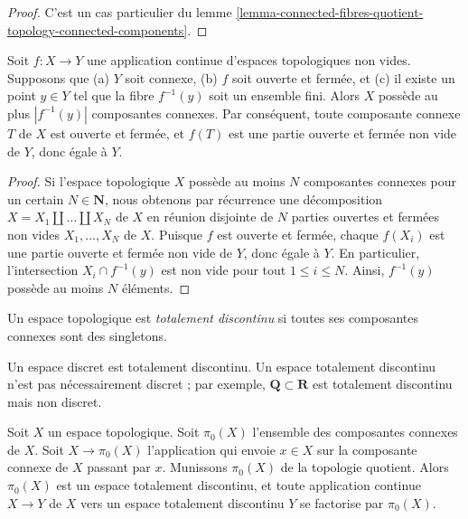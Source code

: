 \begin{proof}
C'est un cas particulier du
lemme \ref{lemma-connected-fibres-quotient-topology-connected-components}.
\end{proof}

\begin{lemma}
\label{lemma-finite-fibre-connected-components}
Soit $f : X \to Y$ une application continue d'espaces topologiques non vides.
Supposons que
(a) $Y$ soit connexe,
(b) $f$ soit ouverte et fermée, et
(c) il existe un point $y\in Y$ tel que la fibre $f^{-1}(y)$ soit un ensemble
fini. Alors $X$ possède au plus $|f^{-1}(y)|$ composantes connexes. Par
conséquent, toute composante connexe $T$ de $X$ est ouverte et fermée, et
$f(T)$ est une partie ouverte et fermée non vide de $Y$, donc égale à $Y$.
\end{lemma}

\begin{proof}
Si l'espace topologique $X$ possède au moins $N$ composantes connexes pour un
certain $N \in \mathbf{N}$, nous obtenons par récurrence une décomposition
$X = X_1 \amalg \ldots \amalg X_N$ de $X$ en réunion disjointe de $N$ parties
ouvertes et fermées non vides $X_1, \ldots , X_N$ de $X$. Puisque $f$ est
ouverte et fermée, chaque $f(X_i)$ est une partie ouverte et fermée non vide de
$Y$, donc égale à $Y$. En particulier, l'intersection
$X_i \cap f^{-1}(y)$ est non vide pour tout $1 \leq i \leq N$. Ainsi,
$f^{-1}(y)$ possède au moins $N$ éléments.
\end{proof}

\begin{definition}
\label{definition-totally-disconnected}
Un espace topologique est {\it totalement discontinu} si toutes ses composantes
connexes sont des singletons.
\end{definition}

\noindent
Un espace discret est totalement discontinu.
Un espace totalement discontinu n'est pas nécessairement discret ; par
exemple, $\mathbf{Q} \subset \mathbf{R}$ est totalement discontinu mais non
discret.

\begin{lemma}
\label{lemma-space-connected-components}
Soit $X$ un espace topologique. Soit $\pi_0(X)$ l'ensemble des composantes
connexes de $X$. Soit $X \to \pi_0(X)$ l'application qui envoie $x \in X$
sur la composante connexe de $X$ passant par $x$. Munissons $\pi_0(X)$ de la
topologie quotient. Alors $\pi_0(X)$ est un espace totalement discontinu, et
toute application continue $X \to Y$ de $X$ vers un espace totalement
discontinu $Y$ se factorise par $\pi_0(X)$.
\end{lemma}

